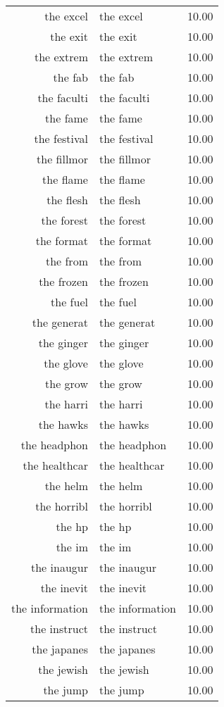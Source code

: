 \begin{table}[ht]
\begin{tabular}{rlr}
  the excel & the excel & 10.00 \\ 
  the exit & the exit & 10.00 \\ 
  the extrem & the extrem & 10.00 \\ 
  the fab & the fab & 10.00 \\ 
  the faculti & the faculti & 10.00 \\ 
  the fame & the fame & 10.00 \\ 
  the festival & the festival & 10.00 \\ 
  the fillmor & the fillmor & 10.00 \\ 
  the flame & the flame & 10.00 \\ 
  the flesh & the flesh & 10.00 \\ 
  the forest & the forest & 10.00 \\ 
  the format & the format & 10.00 \\ 
  the from & the from & 10.00 \\ 
  the frozen & the frozen & 10.00 \\ 
  the fuel & the fuel & 10.00 \\ 
  the generat & the generat & 10.00 \\ 
  the ginger & the ginger & 10.00 \\ 
  the glove & the glove & 10.00 \\ 
  the grow & the grow & 10.00 \\ 
  the harri & the harri & 10.00 \\ 
  the hawks & the hawks & 10.00 \\ 
  the headphon & the headphon & 10.00 \\ 
  the healthcar & the healthcar & 10.00 \\ 
  the helm & the helm & 10.00 \\ 
  the horribl & the horribl & 10.00 \\ 
  the hp & the hp & 10.00 \\ 
  the im & the im & 10.00 \\ 
  the inaugur & the inaugur & 10.00 \\ 
  the inevit & the inevit & 10.00 \\ 
  the information & the information & 10.00 \\ 
  the instruct & the instruct & 10.00 \\ 
  the japanes & the japanes & 10.00 \\ 
  the jewish & the jewish & 10.00 \\ 
  the jump & the jump & 10.00 \\ 

\end{tabular}
\end{table}
